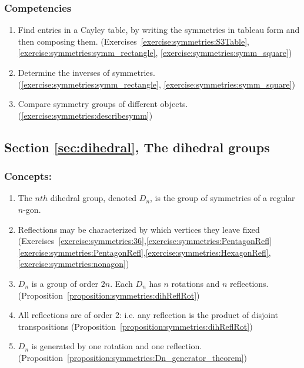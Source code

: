 \subsubsection*{Competencies}
\begin{enumerate}
\item
Find entries in a Cayley table, by writing the symmetries in tableau form and then composing them. (Exercises~\ref{exercise:symmetries:S3Table},\ref{exercise:symmetries:symm_rectangle}, \ref{exercise:symmetries:symm_square})
\item
Determine the inverses of symmetries. (\ref{exercise:symmetries:symm_rectangle},  \ref{exercise:symmetries:symm_square})
\item
Compare symmetry groups of different objects. (\ref{exercise:symmetries:describesymm})
\end{enumerate}


\subsection*{Section \ref{sec:dihedral}, The dihedral groups}
\subsubsection*{Concepts:}
\begin{enumerate}
\item 
The $nth$ dihedral group, denoted $D_n$, is the group of symmetries of a regular $n$-gon.
\item
Reflections may be characterized by which vertices they leave fixed (Exercises~\ref{exercise:symmetries:36},\ref{exercise:symmetries:PentagonRefl}\ref{exercise:symmetries:PentagonRefl},\ref{exercise:symmetries:HexagonRefl},\ref{exercise:symmetries:nonagon}) 
\item
$D_n$ is a group of order $2n$.  Each $D_n$ has $n$ rotations and $n$ reflections. (Proposition~\ref{proposition:symmetries:dihReflRot})
\item
All reflections are of order 2: i.e. any reflection is the product of disjoint transpositions (Proposition~\ref{proposition:symmetries:dihReflRot})

\item
$D_n$ is generated by one rotation and one reflection.  (Proposition~\ref{proposition:symmetries:Dn_generator_theorem})
\end{enumerate}

